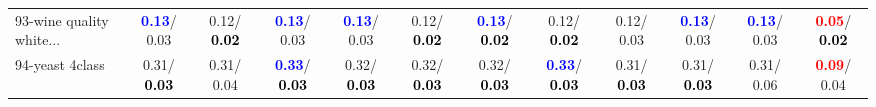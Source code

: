 \begin{table}[h]
\begin{center}
{\begin{tabular}{lc|c|c|c|c|c|c|c|c|c|c}
93-wine quality white... & \textcolor{blue}{\textbf{  0.13}}/  0.03 &   0.12/\textcolor{black}{\textbf{  0.02}} & \textcolor{blue}{\textbf{  0.13}}/  0.03 & \textcolor{blue}{\textbf{  0.13}}/  0.03 &   0.12/\textcolor{black}{\textbf{  0.02}} & \textcolor{blue}{\textbf{  0.13}}/\textcolor{black}{\textbf{  0.02}} &   0.12/\textcolor{black}{\textbf{  0.02}} &   0.12/  0.03 & \textcolor{blue}{\textbf{  0.13}}/  0.03 & \textcolor{blue}{\textbf{  0.13}}/  0.03 & \textcolor{red}{\textbf{  0.05}}/\textcolor{black}{\textbf{  0.02}} \\
94-yeast 4class &   0.31/\textcolor{black}{\textbf{  0.03}} &   0.31/  0.04 & \textcolor{blue}{\textbf{  0.33}}/\textcolor{black}{\textbf{  0.03}} &   0.32/\textcolor{black}{\textbf{  0.03}} &   0.32/\textcolor{black}{\textbf{  0.03}} &   0.32/\textcolor{black}{\textbf{  0.03}} & \textcolor{blue}{\textbf{  0.33}}/\textcolor{black}{\textbf{  0.03}} &   0.31/\textcolor{black}{\textbf{  0.03}} &   0.31/\textcolor{black}{\textbf{  0.03}} &   0.31/  0.06 & \textcolor{red}{\textbf{  0.09}}/  0.04 \\\end{tabular}}\label{stratsALCKappa2aC4.5wRedux}
\end{center}
\end{table}
